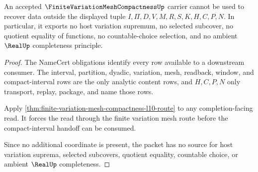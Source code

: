\begin{theorem}
\label{thm:finite-variation-mesh-compactness-nonescape}
An accepted $\FiniteVariationMeshCompactnessUp$ carrier cannot be used to recover data outside the displayed tuple $I,\Pi,D,V,M,R,S,K,H,C,P,N$. In particular, it exports no host variation supremum, no selected subcover, no quotient equality of functions, no countable-choice selection, and no ambient $\RealUp$ completeness principle.
\end{theorem}
\begin{proof}
The NameCert obligations identify every row available to a downstream consumer. The interval, partition, dyadic, variation, mesh, readback, window, and compact-interval rows are the only analytic content rows, and $H,C,P,N$ only transport, replay, package, and name those rows.

Apply \autoref{thm:finite-variation-mesh-compactness-l10-route} to any completion-facing read. It forces the read through the finite variation mesh route before the compact-interval handoff can be consumed.

Since no additional coordinate is present, the packet has no source for host variation suprema, selected subcovers, quotient equality, countable choice, or ambient $\RealUp$ completeness.
\end{proof}



